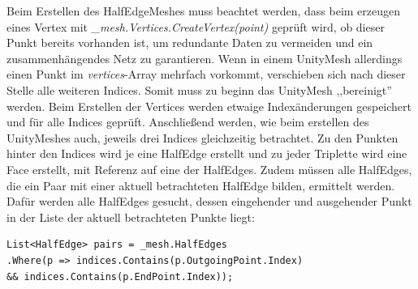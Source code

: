 Beim Erstellen des HalfEdgeMeshes muss beachtet werden, dass beim erzeugen eines Vertex mit \textit{\_mesh.Vertices.CreateVertex(point)} gepr\"uft wird, ob dieser Punkt bereits vorhanden ist, um redundante Daten zu vermeiden und ein zusammenh\"angendes Netz zu garantieren. Wenn in einem UnityMesh allerdings einen Punkt im \textit{vertices}-Array mehrfach vorkommt, verschieben sich nach dieser Stelle alle weiteren Indices. Somit muss zu beginn das UnityMesh ,,bereinigt'' werden. Beim Erstellen der Vertices werden etwaige Index\"anderungen gespeichert und f\"ur alle Indices gepr\"uft. Anschlie{\ss}end werden, wie beim erstellen des UnityMeshes auch, jeweils drei Indices gleichzeitig betrachtet. Zu den Punkten hinter den Indices wird je eine HalfEdge erstellt und zu jeder Triplette wird eine Face erstellt, mit Referenz auf eine der HalfEdges. Zudem m\"ussen alle HalfEdges, die ein Paar mit einer aktuell betrachteten HalfEdge bilden, ermittelt werden. Daf\"ur werden alle HalfEdges gesucht, dessen eingehender und ausgehender Punkt in der Liste der aktuell betrachteten Punkte liegt: 
\begin{lstlisting}
List<HalfEdge> pairs = _mesh.HalfEdges
.Where(p => indices.Contains(p.OutgoingPoint.Index)
&& indices.Contains(p.EndPoint.Index));
\end{lstlisting}